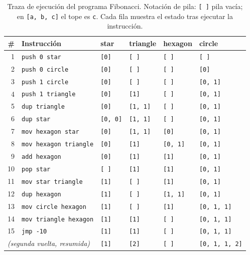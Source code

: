\begin{table}[h]
\centering
\caption{Traza de ejecuci\'on del programa Fibonacci. Notaci\'on de
pila: \texttt{[\,]} pila vac\'ia; en \texttt{[a, b, c]} el tope es
\texttt{c}. Cada fila muestra el estado tras ejecutar la instrucci\'on.}
\label{tab:fibo-trace}
\footnotesize
\begin{tabular}{@{}rlllll@{}}
\toprule
\# & Instrucci\'on & \textbf{star} & \textbf{triangle} & \textbf{hexagon} & \textbf{circle} \\
\midrule
 1 & \texttt{push 0 star}        & \texttt{[0]}    & \texttt{[\,]}    & \texttt{[\,]}    & \texttt{[\,]}        \\
 2 & \texttt{push 0 circle}      & \texttt{[0]}    & \texttt{[\,]}    & \texttt{[\,]}    & \texttt{[0]}         \\
 3 & \texttt{push 1 circle}      & \texttt{[0]}    & \texttt{[\,]}    & \texttt{[\,]}    & \texttt{[0, 1]}      \\
 4 & \texttt{push 1 triangle}    & \texttt{[0]}    & \texttt{[1]}     & \texttt{[\,]}    & \texttt{[0, 1]}      \\
\midrule
 5 & \texttt{dup triangle}       & \texttt{[0]}    & \texttt{[1, 1]}  & \texttt{[\,]}    & \texttt{[0, 1]}      \\
 6 & \texttt{dup star}           & \texttt{[0, 0]} & \texttt{[1, 1]}  & \texttt{[\,]}    & \texttt{[0, 1]}      \\
 7 & \texttt{mov hexagon star} & \texttt{[0]}    & \texttt{[1, 1]}  & \texttt{[0]}     & \texttt{[0, 1]}      \\
 8 & \texttt{mov hexagon triangle} & \texttt{[0]} & \texttt{[1]}    & \texttt{[0, 1]}  & \texttt{[0, 1]}      \\
 9 & \texttt{add hexagon}      & \texttt{[0]}    & \texttt{[1]}     & \texttt{[1]}     & \texttt{[0, 1]}      \\
10 & \texttt{pop star}           & \texttt{[\,]}   & \texttt{[1]}     & \texttt{[1]}     & \texttt{[0, 1]}      \\
11 & \texttt{mov star triangle}  & \texttt{[1]}    & \texttt{[\,]}    & \texttt{[1]}     & \texttt{[0, 1]}      \\
12 & \texttt{dup hexagon}      & \texttt{[1]}    & \texttt{[\,]}    & \texttt{[1, 1]}  & \texttt{[0, 1]}      \\
13 & \texttt{mov circle hexagon} & \texttt{[1]}  & \texttt{[\,]}    & \texttt{[1]}     & \texttt{[0, 1, 1]}   \\
14 & \texttt{mov triangle hexagon} & \texttt{[1]} & \texttt{[1]}    & \texttt{[\,]}    & \texttt{[0, 1, 1]}   \\
15 & \texttt{jmp -10}            & \texttt{[1]}    & \texttt{[1]}     & \texttt{[\,]}    & \texttt{[0, 1, 1]}   \\
\midrule
\multicolumn{2}{l}{\emph{(segunda vuelta, resumida)}} & \texttt{[1]} & \texttt{[2]} & \texttt{[\,]} & \texttt{[0, 1, 1, 2]} \\
\bottomrule
\end{tabular}
\end{table}


